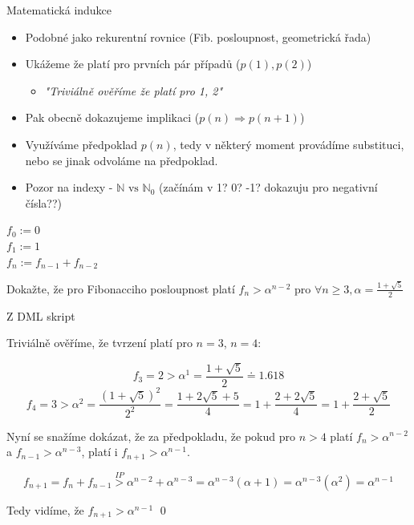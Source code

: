 \documentclass[aspectratio=1610]{beamer}
\begin{document}
\begin{frame}{Matematická indukce}

\begin{itemize}
  \item Podobné jako rekurentní rovnice (Fib. posloupnost, geometrická řada)
  \item Ukážeme že platí pro prvních pár případů ($p(1), p(2)$) \begin{itemize}
    \item \textit{"Triviálně ověříme že platí pro 1, 2"}
  \end{itemize}
  \item Pak obecně dokazujeme implikaci ($p(n) \Rightarrow p(n + 1)$)
  \item Využíváme předpoklad $p(n)$, tedy v některý moment provádíme substituci,
    nebo se jinak odvoláme na předpoklad.
  \item Pozor na indexy - $\mathbb{N} \text{ vs } \mathbb{N}_0$ (začínám v 1? 0?
    -1? dokazuju pro negativní čísla??)
\end{itemize}

\end{frame}

\begin{frame}

\begin{definition}
  $f_0 := 0$ \\ 
  $f_1 := 1$ \\
  $f_n := f_{n - 1} + f_{n - 2}$
\end{definition}

\begin{problem}
  Dokažte, že pro Fibonacciho posloupnost platí $f_n > \alpha^{n - 2}$ pro $\forall n \geq 3, \alpha = \frac{1 + \sqrt{5}}{2}$

  Z DML skript\cite{courses:DMLfib}
\end{problem}

\end{frame}

\begin{frame}

Triviálně ověříme, že tvrzení platí pro $n = 3$, $n = 4$:

\[
  f_3 = 2 > \alpha^1 = \frac{1 + \sqrt{5}}{2} \doteq 1.618
\]
\[
  f_4 = 3 > \alpha^2 = \frac{(1 + \sqrt{5})^2}{2^2} = \frac{1 + 2\sqrt{5} + 5}{4} = 1 + \frac{2 + 2\sqrt{5}}{4} = 1 + \frac{2 + \sqrt{5}}{2}
\]

\hspace{1em}

Nyní se snažíme dokázat, že za předpokladu, že pokud pro $n > 4$ platí $f_n > \alpha^{n - 2}$ a $f_{n - 1} > \alpha^{n - 3}$, platí i $f_{n + 1} > \alpha^{n - 1}$.

\[
  f_{n + 1} = f_n + f_{n - 1} \overset{IP}{>} \alpha^{n - 2} + \alpha^{n - 3} = \alpha^{n - 3}(\alpha + 1) = \alpha^{n - 3}(\alpha^2) = \alpha^{n - 1}
\]

Tedy vidíme, že $f_{n + 1} > \alpha^{n - 1}$ \qed

\end{frame}
\end{document}
